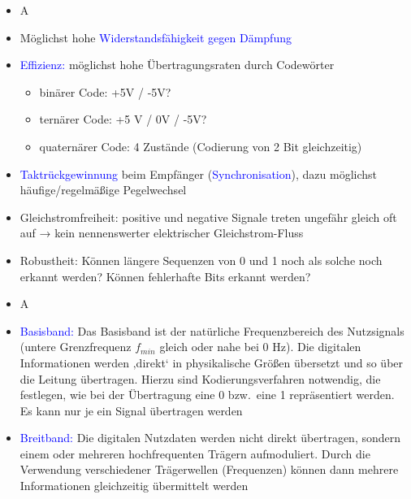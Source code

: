 
\begin{itemize}
    \item \todo A
\end{itemize}

\begin{itemize}
    \item Möglichst hohe \textcolor{blue}{Widerstandsfähigkeit gegen Dämpfung}
    \item \textcolor{blue}{Effizienz:} möglichst hohe Übertragungsraten durch Codewörter
    \begin{itemize}
        \item binärer Code: +5V / -5V?
        \item ternärer Code: +5 V / 0V / -5V?
        \item quaternärer Code: 4 Zustände (Codierung von 2 Bit gleichzeitig)
    \end{itemize}
    \item \textcolor{blue}{Taktrückgewinnung} beim Empfänger (\textcolor{blue}{Synchronisation}), dazu möglichst
    häufige/regelmäßige Pegelwechsel
    \item Gleichstromfreiheit: positive und negative Signale treten ungefähr gleich oft auf → kein nennenswerter elektrischer Gleichstrom-Fluss
    \item Robustheit: Können längere Sequenzen von 0 und 1 noch als solche noch erkannt werden?
    Können fehlerhafte Bits erkannt werden?
\end{itemize}

\begin{itemize}
    \item \todo A
\end{itemize}

\begin{itemize}
    \item \textcolor{blue}{Basisband:} Das Basisband ist der natürliche Frequenzbereich des Nutzsignals (untere Grenzfrequenz $f_{min}$ gleich oder nahe bei 0 Hz).
    Die digitalen Informationen werden ‚direkt‘ in physikalische Größen übersetzt und so über die Leitung übertragen.
    Hierzu sind Kodierungsverfahren notwendig, die festlegen, wie bei der Übertragung eine 0 bzw.\ eine 1 repräsentiert werden.
    Es kann nur je ein Signal übertragen werden
    \item \textcolor{blue}{Breitband:} Die digitalen Nutzdaten werden nicht direkt übertragen, sondern einem oder mehreren hochfrequenten Trägern aufmoduliert.
    Durch die Verwendung verschiedener Trägerwellen (Frequenzen) können dann mehrere Informationen gleichzeitig übermittelt werden
\end{itemize}

